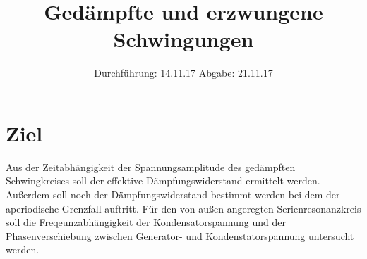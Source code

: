 

\subject{V354}
\title{Gedämpfte und erzwungene Schwingungen}
\date{%
  Durchführung: 14.11.17
  \hspace{3em}
  Abgabe: 21.11.17
}



\maketitle
\thispagestyle{empty}
\tableofcontents
\newpage

\section{Ziel}
\label{sec:Ziel}

Aus der Zeitabhängigkeit der Spannungsamplitude des gedämpften Schwingkreises soll der effektive Dämpfungswiderstand ermittelt werden.
Außerdem soll noch der Dämpfungswiderstand bestimmt werden bei dem der aperiodische Grenzfall auftritt.
Für den von außen angeregten Serienresonanzkreis soll die Freqeunzabhängigkeit der Kondensatorspannung und der Phasenverschiebung zwischen Generator- und Kondenstatorspannung untersucht werden.






\printbibliography{}



